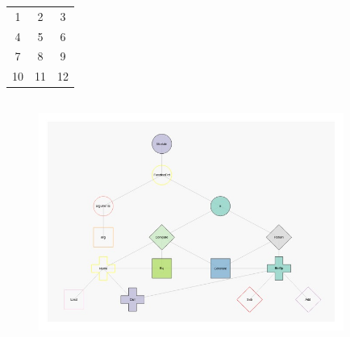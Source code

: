 \documentclass{article}
\begin{document}
\begin{tabular}{ |c|c|c| }
\hline 
1 & 2 & 3 \\ 
4 & 5 & 6 \\ 
7 & 8 & 9 \\ 
10 & 11 & 12 \\ 
\hline 
\end{tabular}
\begin{figure}[h]
\includegraphics[width=10cm, height=8cm]{ast_new_fib.jpg}
\end{figure}
\end{document}
